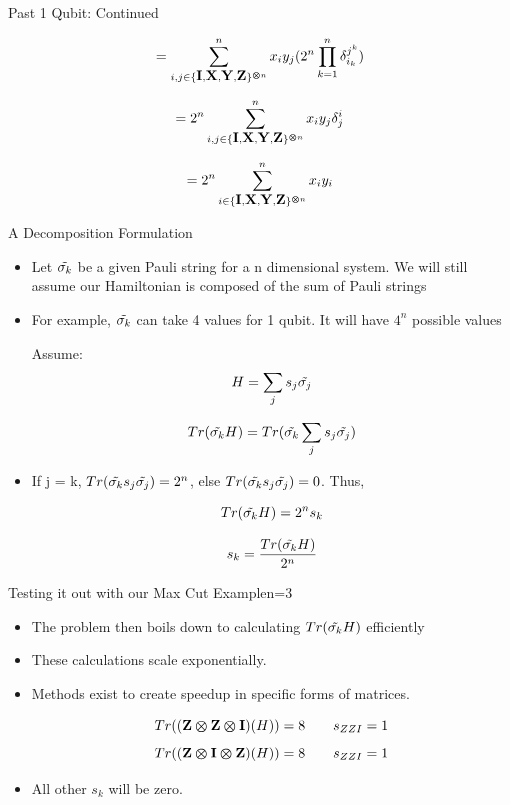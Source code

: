 \begin{frame}{Past 1 Qubit: Continued}

\[=\sum_{i,j \in \{\mbox{\bfseries{\textrm{I}}},\mbox{\bfseries{\textrm{X}}},\mbox{\bfseries{\textrm{Y}}},\mbox{\bfseries{\textrm{Z}}}\}^{\bm{\otimes} n}}^n x_i y_j ( 2^n \prod_{k=1}^n \delta_{i_k}^{j^k})
\]

\[= 2^n  \sum_{i,j \in \{\mbox{\bfseries{\textrm{I}}},\mbox{\bfseries{\textrm{X}}},\mbox{\bfseries{\textrm{Y}}},\mbox{\bfseries{\textrm{Z}}}\}^{\bm{\otimes} n}}^n x_i y_j \delta_j^i
\]

\[= 2^n \sum_{i \in \{\mbox{\bfseries{\textrm{I}}},\mbox{\bfseries{\textrm{X}}},\mbox{\bfseries{\textrm{Y}}},\mbox{\bfseries{\textrm{Z}}}\}^{\bm{\otimes} n}}^n x_i y_i
\]    
\end{frame}

\begin{frame}{A Decomposition Formulation}
\begin{itemize}
    \item Let $\Tilde{\sigma_k}$ be a given Pauli string for a n dimensional system. We will still assume our Hamiltonian is composed of the sum of Pauli strings
    \item For example, $\Tilde{\sigma_k}$ can take 4 values for 1 qubit. It will have $4^n$ possible values

    
    Assume: 
    \vspace{-3mm}
    \[H = \sum_j s_j \Tilde{\sigma_j }
    \]

    \[Tr(\Tilde{\sigma_k} H) = Tr(\Tilde{\sigma_k}\sum_js_j\Tilde{\sigma_j })
    \]


    \item If j = k, $Tr(\Tilde{\sigma_k} s_j \Tilde{\sigma_j}) = 2^n$, else $Tr(\Tilde{\sigma_k} s_j \Tilde{\sigma_j}) = 0$. Thus, 
   
    \[Tr(\Tilde{\sigma_k} H) = 2^n s_k\]

    \[s_k = \frac{Tr(\Tilde{\sigma_k}H)}{2^n}
    \]
    

    
\end{itemize}
    
\end{frame}

\begin{frame}{Testing it out with our Max Cut Example}{n=3}
    \begin{itemize}
        \item The problem then boils down to calculating $Tr(\Tilde{\sigma_k}H)$ efficiently
        \item These calculations scale exponentially. 
        \item Methods exist to create speedup in specific forms of matrices. 
        

        \[Tr((\mbox{\bfseries{\textrm{Z}}} \bm{\otimes} \mbox{\bfseries{\textrm{Z}}} \bm{\otimes} \mbox{\bfseries{\textrm{I}}})(H)) = 8 \quad \quad s_{ZZI} = 1
        \]
        \[Tr((\mbox{\bfseries{\textrm{Z}}} \bm{\otimes} \mbox{\bfseries{\textrm{I}}} \bm{\otimes} \mbox{\bfseries{\textrm{Z}}})(H)) = 8 \quad \quad s_{ZZI} = 1
        \]
        \item All other $s_k$ will be zero.
    \end{itemize}
\end{frame}


